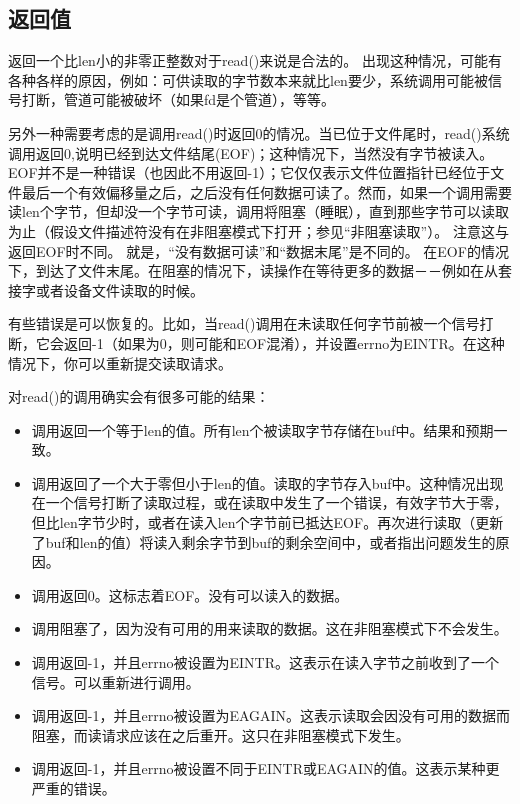 \subsection{返回值}

返回一个比len小的非零正整数对于read()来说是合法的。 出现这种情况，可能有各种各样的原因，例如：可供读取的字节数本来就比len要少，系统调用可能被信号打断，管道可能被破坏（如果fd是个管道），等等。

另外一种需要考虑的是调用read()时返回0的情况。当已位于文件尾时，read()系统调用返回0,说明已经到达文件结尾(EOF)；这种情况下，当然没有字节被读入。 EOF并不是一种错误（也因此不用返回-1）；它仅仅表示文件位置指针已经位于文件最后一个有效偏移量之后，之后没有任何数据可读了。然而，如果一个调用需要读len个字节，但却没一个字节可读，调用将阻塞（睡眠），直到那些字节可以读取为止（假设文件描述符没有在非阻塞模式下打开；参见“非阻塞读取”）。 注意这与返回EOF时不同。 就是，“没有数据可读”和“数据末尾”是不同的。 在EOF的情况下，到达了文件末尾。在阻塞的情况下，读操作在等待更多的数据－－例如在从套接字或者设备文件读取的时候。

有些错误是可以恢复的。比如，当read()调用在未读取任何字节前被一个信号打断，它会返回-1（如果为0，则可能和EOF混淆），并设置errno为EINTR。在这种情况下，你可以重新提交读取请求。

对read()的调用确实会有很多可能的结果：
\begin{itemize}
\item 调用返回一个等于len的值。所有len个被读取字节存储在buf中。结果和预期一致。

\item 调用返回了一个大于零但小于len的值。读取的字节存入buf中。这种情况出现在一个信号打断了读取过程，或在读取中发生了一个错误，有效字节大于零，但比len字节少时，或者在读入len个字节前已抵达EOF。再次进行读取（更新了buf和len的值）将读入剩余字节到buf的剩余空间中，或者指出问题发生的原因。
\item 调用返回0。这标志着EOF。没有可以读入的数据。

\item 调用阻塞了，因为没有可用的用来读取的数据。这在非阻塞模式下不会发生。

\item 调用返回-1，并且errno被设置为EINTR。这表示在读入字节之前收到了一个信号。可以重新进行调用。

\item 调用返回-1，并且errno被设置为EAGAIN。这表示读取会因没有可用的数据而阻塞，而读请求应该在之后重开。这只在非阻塞模式下发生。

\item 调用返回-1，并且errno被设置不同于EINTR或EAGAIN的值。这表示某种更严重的错误。

\end{itemize}
